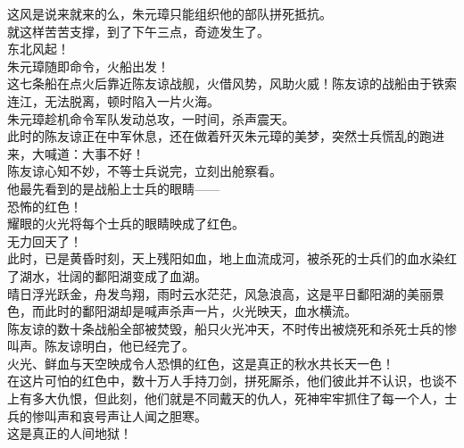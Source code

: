 \begin{multicols}{\theparacolNo}
这风是说来就来的么，朱元璋只能组织他的部队拼死抵抗。\\

就这样苦苦支撑，到了下午三点，奇迹发生了。\\

东北风起！\\

朱元璋随即命令，火船出发！\\

这七条船在点火后靠近陈友谅战舰，火借风势，风助火威！陈友谅的战船由于铁索连江，无法脱离，顿时陷入一片火海。\\

朱元璋趁机命令军队发动总攻，一时间，杀声震天。\\

此时的陈友谅正在中军休息，还在做着歼灭朱元璋的美梦，突然士兵慌乱的跑进来，大喊道：大事不好！\\

陈友谅心知不妙，不等士兵说完，立刻出舱察看。\\

他最先看到的是战船上士兵的眼睛——\\

恐怖的红色！\\

耀眼的火光将每个士兵的眼睛映成了红色。\\

无力回天了！\\

此时，已是黄昏时刻，天上残阳如血，地上血流成河，被杀死的士兵们的血水染红了湖水，壮阔的鄱阳湖变成了血湖。\\

晴日浮光跃金，舟发鸟翔，雨时云水茫茫，风急浪高，这是平日鄱阳湖的美丽景色，而此时的鄱阳湖却是喊声杀声一片，火光映天，血水横流。\\

陈友谅的数十条战船全部被焚毁，船只火光冲天，不时传出被烧死和杀死士兵的惨叫声。陈友谅明白，他已经完了。\\

火光、鲜血与天空映成令人恐惧的红色，这是真正的秋水共长天一色！\\

在这片可怕的红色中，数十万人手持刀剑，拼死厮杀，他们彼此并不认识，也谈不上有多大仇恨，但此刻，他们就是不同戴天的仇人，死神牢牢抓住了每一个人，士兵的惨叫声和哀号声让人闻之胆寒。\\

这是真正的人间地狱！\\


\end{multicols}
